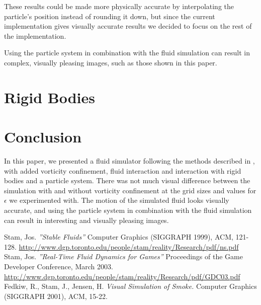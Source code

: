 \documentclass[a4paper,twoside,11pt,twocolumn]{article}
\begin{document}
These results could be made more physically accurate by interpolating the particle's position instead of rounding it down, but since the current implementation gives visually accurate results we decided to focus on the rest of the implementation.

Using the particle system in combination with the fluid simulation can result in complex, visually pleasing images, such as those shown in this paper.

\section{Rigid Bodies}

\section{Conclusion}
In this paper, we presented a fluid simulator following the methods described in \cite{url:stam1, url:stam2}, with added vorticity confinement, fluid interaction and interaction with rigid bodies and a particle system. There was not much visual difference between the simulation with and without vorticity confinement at the grid sizes and values for $\epsilon$ we experimented with.
The motion of the simulated fluid looks visually accurate, and using the particle system in combination with the fluid simulation can result in interesting and visually pleasing images.


\begin{thebibliography}{9}
		Stam, Jos. \emph{''Stable Fluids''} Computer Graphics (SIGGRAPH 1999), ACM, 121-128. \url{http://www.dgp.toronto.edu/people/stam/reality/Research/pdf/ns.pdf}
		Stam, Jos. \emph{''Real-Time Fluid Dynamics for Games''} Proceedings of the Game Developer Conference, March 2003. \url{http://www.dgp.toronto.edu/people/stam/reality/Research/pdf/GDC03.pdf}
		Fedkiw, R., Stam, J., Jensen, H. \emph{Visual Simulation of Smoke.} Computer Graphics (SIGGRAPH 2001), ACM, 15-22.
	
\end{thebibliography}
\end{document}
